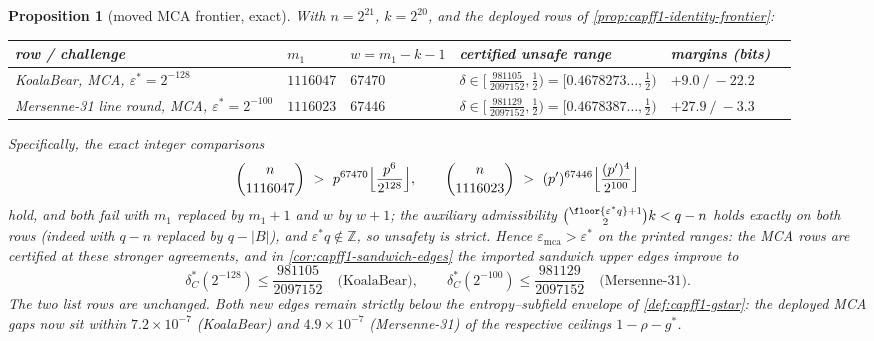 \documentclass[11pt]{article}
\newtheorem{proposition}[proposition]{Proposition}
\theoremstyle{definition}
\theoremstyle{remark}
\newcommand{\B}{B}
\newcommand{\emca}{\varepsilon_{\mathrm{mca}}}
\begin{document}
\begin{proposition}[moved MCA frontier, exact]\label{prop:capg-moved-frontier}
With $n=2^{21}$, $k=2^{20}$, and the deployed rows of
\cref{prop:capff1-identity-frontier}:
\begin{center}\footnotesize
\begin{tabular}{@{}llllll@{}}
\toprule
row / challenge & $m_1$ & $w=m_1-k-1$ & certified unsafe range &
margins (bits) \\
\midrule
KoalaBear, MCA, $\varepsilon^{*}=2^{-128}$ & $1116047$ & $67470$ &
$\delta\in[\,\tfrac{981105}{2097152},\tfrac12)=[0.4678273\ldots,\tfrac12)$
& $+9.0\ /\ -22.2$ \\
Mersenne-31 line round, MCA, $\varepsilon^{*}=2^{-100}$ & $1116023$ &
$67446$ &
$\delta\in[\,\tfrac{981129}{2097152},\tfrac12)=[0.4678387\ldots,\tfrac12)$
& $+27.9\ /\ -3.3$ \\
\bottomrule
\end{tabular}
\end{center}
Specifically, the exact integer comparisons
\[
        \binom{n}{1116047}\ >\ p^{67470}\Bigl\lfloor\frac{p^{6}}{2^{128}}\Bigr\rfloor,
        \qquad
        \binom{n}{1116023}\ >\ (p')^{67446}\Bigl\lfloor\frac{(p')^{4}}{2^{100}}\Bigr\rfloor
\]
hold, and both fail with $m_1$ replaced by $m_1+1$ and $w$ by $w+1$; the
auxiliary admissibility
$\binom{\floor{\varepsilon^{*}q}+1}{2}k<q-n$ holds exactly on both rows
(indeed with $q-n$ replaced by $q-|\B|$), and
$\varepsilon^{*}q\notin\mathbb Z$, so unsafety is strict.  Hence
$\emca>\varepsilon^{*}$ on the printed ranges: the MCA rows are certified at these stronger agreements, and in \cref{cor:capff1-sandwich-edges} the imported sandwich
upper edges improve to
\[
        \delta^{*}_{C}(2^{-128})\le\frac{981105}{2097152}
        \quad\text{(KoalaBear)},\qquad
        \delta^{*}_{C}(2^{-100})\le\frac{981129}{2097152}
        \quad\text{(Mersenne-31)}.
\]
The two list rows are unchanged.  Both new edges remain strictly below the
entropy--subfield envelope of \cref{def:capff1-gstar}: the deployed MCA
gaps now sit within $7.2\times10^{-7}$ (KoalaBear) and
$4.9\times10^{-7}$ (Mersenne-31) of the respective ceilings
$1-\rho-g^{*}$.
\end{proposition}
\end{document}
